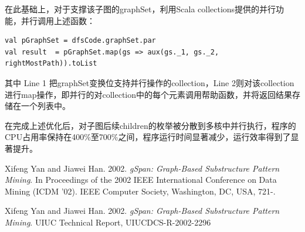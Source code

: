 \documentclass{article}
\begin{document}
在此基础上，对于支撑该子图的graphSet，利用Scala collections提供的并行功能，并行调用上述函数：

\begin{lstlisting}[style=mStyle]
val pGraphSet = dfsCode.graphSet.par
val result  = pGraphSet.map(gs => aux(gs._1, gs._2, rightMostPath)).toList
\end{lstlisting}

其中 Line 1 把graphSet变换位支持并行操作的collection，Line 2则对该collection进行map操作，即并行的对collection中的每个元素调用帮助函数，并将返回结果存储在一个列表中。

在完成上述优化后，对子图后续children的枚举被分散到多核中并行执行，程序的CPU占用率保持在400\%至700\%之间，程序运行时间显著减少，运行效率得到了显著提升。


\begin{thebibliography}{9}

  Xifeng Yan and Jiawei Han. 2002. \emph{gSpan: Graph-Based Substructure Pattern Mining}. In Proceedings of the 2002 IEEE International Conference on Data Mining (ICDM '02). IEEE Computer Society, Washington, DC, USA, 721-.


  Xifeng Yan and Jiawei Han. 2002. \emph{gSpan: Graph-Based Substructure Pattern Mining}. UIUC Technical Report, UIUCDCS-R-2002-2296

\end{thebibliography}
\end{document}
